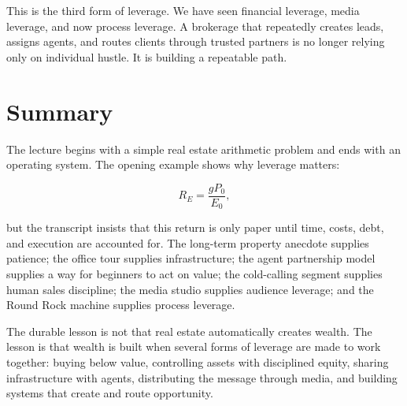 This is the third form of leverage. We have seen financial leverage, media leverage, and now process leverage. A brokerage that repeatedly creates leads, assigns agents, and routes clients through trusted partners is no longer relying only on individual hustle. It is building a repeatable path.

\section{Summary}

The lecture begins with a simple real estate arithmetic problem and ends with an operating system. The opening example shows why leverage matters:

\[
R_E = \frac{gP_0}{E_0},
\]

but the transcript insists that this return is only paper until time, costs, debt, and execution are accounted for. The long-term property anecdote supplies patience; the office tour supplies infrastructure; the agent partnership model supplies a way for beginners to act on value; the cold-calling segment supplies human sales discipline; the media studio supplies audience leverage; and the Round Rock machine supplies process leverage.

The durable lesson is not that real estate automatically creates wealth. The lesson is that wealth is built when several forms of leverage are made to work together: buying below value, controlling assets with disciplined equity, sharing infrastructure with agents, distributing the message through media, and building systems that create and route opportunity.